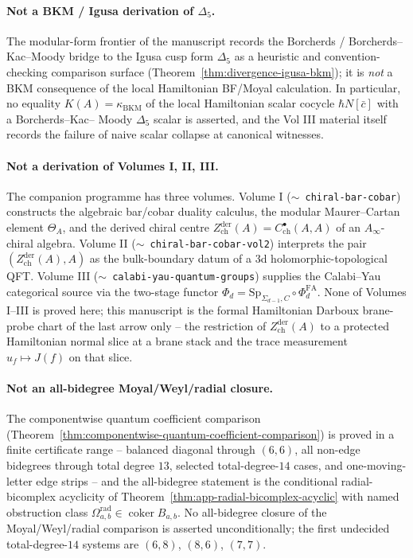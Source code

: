 \paragraph{Not a BKM / Igusa derivation of \(\Delta_5\).}  The
modular-form frontier of the manuscript records the Borcherds /
Borcherds--Kac--Moody bridge to the Igusa cusp form \(\Delta_5\) as a
heuristic and convention-checking comparison surface
(Theorem~\ref{thm:divergence-igusa-bkm}); it is \emph{not} a BKM
consequence of the local Hamiltonian BF/Moyal calculation.  In
particular, no equality \(K(A)=\kappa_{\mathrm{BKM}}\) of the local
Hamiltonian scalar cocycle \(\hbar N[\bar c]\) with a Borcherds--Kac--
Moody \(\Delta_5\) scalar is asserted, and the Vol III material itself
records the failure of naive scalar collapse at canonical witnesses.

\paragraph{Not a derivation of Volumes I, II, III.}  The companion
programme has three volumes.  Volume I (\(\sim\)~\texttt{chiral-bar-cobar})
constructs the algebraic bar/cobar duality calculus, the modular
Maurer--Cartan element \(\Theta_A\), and the derived chiral centre
\(Z^{\mathrm{der}}_{\mathrm{ch}}(A)=C^\bullet_{\mathrm{ch}}(A,A)\) of
an \(A_\infty\)-chiral algebra.  Volume II
(\(\sim\)~\texttt{chiral-bar-cobar-vol2}) interprets the pair
\((Z^{\mathrm{der}}_{\mathrm{ch}}(A),A)\) as the bulk-boundary datum of
a 3d holomorphic-topological QFT.  Volume III
(\(\sim\)~\texttt{calabi-yau-quantum-groups}) supplies the Calabi--Yau
categorical source via the two-stage functor
\(\Phi_d=\mathrm{Sp}_{\Sigma_{d-1},C}\circ\Phi^{\mathrm{FA}}_d\).
None of Volumes I--III is proved here; this manuscript is the formal
Hamiltonian Darboux brane-probe chart of the last arrow only -- the
restriction of \(Z^{\mathrm{der}}_{\mathrm{ch}}(A)\) to a protected
Hamiltonian normal slice at a brane stack and the trace measurement
\(u_f\mapsto J(f)\) on that slice.

\paragraph{Not an all-bidegree Moyal/Weyl/radial closure.}  The
componentwise quantum coefficient comparison
(Theorem~\ref{thm:componentwise-quantum-coefficient-comparison}) is
proved in a finite certificate range -- balanced diagonal through
\((6,6)\), all non-edge bidegrees through total degree \(13\),
selected total-degree-\(14\) cases, and one-moving-letter edge strips
-- and the all-bidegree statement is the conditional radial-bicomplex
acyclicity of Theorem~\ref{thm:app-radial-bicomplex-acyclic} with
named obstruction class
\(\Omega^{\mathrm{rad}}_{a,b}\in\operatorname{coker}B_{a,b}\).  No
all-bidegree closure of the Moyal/Weyl/radial comparison is asserted
unconditionally; the first undecided total-degree-\(14\) systems are
\((6,8)\), \((8,6)\), \((7,7)\).

